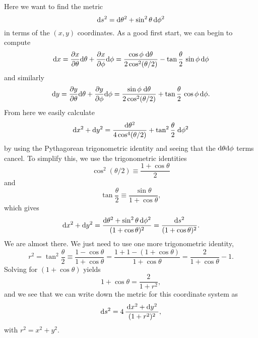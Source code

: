 \documentclass[11pt,a4paper, 
swedish, english %
]{article}
\begin{document}
Here we want to find the metric 
\begin{equation}
\mathrm{d}{s}^2=\mathrm{d}\theta^2+\sin^2\theta\,\mathrm{d}\phi^2
\end{equation}
in terms of the $(x,y)$ coordinates. As a good first start, we can
begin to compute
\begin{equation}
\mathrm{d}{x}=\pdv{x}{\theta}\mathrm{d}\theta+\pdv{x}{\phi}\mathrm{d}\phi
=\frac{\cos\phi\;\mathrm{d}\theta}{2\cos^2(\theta/2)}
-\tan\frac{\theta}{2}\,\sin\phi\,\mathrm{d}\phi
\end{equation}
and similarly
\begin{equation}
\mathrm{d}{y}=\pdv{y}{\theta}\mathrm{d}\theta+\pdv{y}{\phi}\mathrm{d}\phi
=\frac{\sin\phi\;\mathrm{d}\theta}{2\cos^2(\theta/2)}
+\tan\frac{\theta}{2}\,\cos\phi\,\mathrm{d}\phi.
\end{equation}
From here we easily calculate
\begin{equation}
\mathrm{d}{x}^2+\mathrm{d}{y}^2=
\frac{\mathrm{d}\theta^2}{4\cos^4(\theta/2)} 
+\tan^2\frac{\theta}{2}\;\mathrm{d}\phi^2
\end{equation}
by using the Pythagorean trigonometric identity and seeing that the
$\mathrm{d}\theta\mathrm{d}\phi$ terms cancel. To simplify this, we use the
trigonometric identities
\begin{equation}
\cos^2(\theta/2)\equiv\frac{1+\cos\theta}{2}
\end{equation}
and
\begin{equation}
\tan\frac{\theta}{2}\equiv \frac{\sin\theta}{1+\cos\theta},
\end{equation}
which gives
\begin{equation}
\mathrm{d}{x}^2+\mathrm{d}{y}^2
=\frac{\mathrm{d}\theta^2+\sin^2\theta\,\mathrm{d}\phi^2}{(1+\cos\theta)^2} 
=\frac{\mathrm{d}{s}^2}{(1+\cos\theta)^2}.
\end{equation}
We are almost there. We just need to use one more trigonometric
identity,
\begin{equation}
r^2=\tan^2\frac{\theta}{2}\equiv
\frac{1-\cos\theta}{1+\cos\theta}
=\frac{1+1-(1+\cos\theta)}{1+\cos\theta}
=\frac{2}{1+\cos\theta}-1.
\end{equation}
Solving for $(1+\cos\theta)$ yields
\begin{equation}
1+\cos\theta=\frac{2}{1+r^2},
\end{equation}
and we see that we can write down the metric for this coordinate
system as
\begin{equation}\label{eq4:ds2-sphere}
\mathrm{d}{s}^2=4\,\frac{\,\mathrm{d}{x}^2+\mathrm{d}{y}^2\,}{(1+r^2)^2},
\end{equation}
with $r^2=x^2+y^2$.
\end{document}
